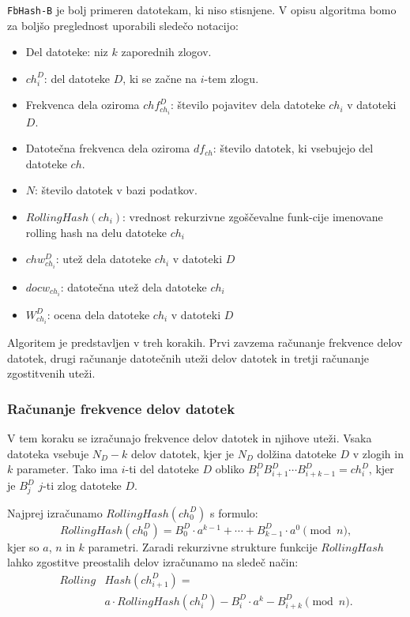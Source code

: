 \documentclass{acm_proc_article-sp}
\begin{document}
\texttt{FbHash-B} je bolj primeren datotekam, ki niso stisnjene. V opisu algoritma bomo za boljšo preglednost uporabili sledečo notacijo:
\begin{itemize}
  \item Del datoteke: niz $k$ zaporednih zlogov. 
  \item $ch_{i}^D$: del datoteke $D$, ki se začne na $i$-tem zlogu.
  \item Frekvenca dela oziroma $chf_{ch_i}^D$: število pojavitev dela datoteke $ch_i$ v datoteki $D$.
  \item Datotečna frekvenca dela oziroma $df_{ch}$: število datotek, ki vsebujejo del datoteke $ch$.
  \item $N$: število datotek v bazi podatkov.
  \item $RollingHash(ch_i)$: vrednost rekurzivne zgoščevalne funk-cije imenovane rolling hash na delu datoteke $ch_i$
  \item $chw_{ch_i}^D$: utež dela datoteke $ch_i$ v datoteki $D$
  \item $docw_{ch_i}$: datotečna utež dela datoteke $ch_i$
  \item $W_{ch_i}^D$: ocena dela datoteke $ch_i$ v datoteki $D$
\end{itemize}

Algoritem je predstavljen v treh korakih. Prvi zavzema računanje frekvence delov datotek, drugi računanje datotečnih uteži delov datotek in tretji računanje zgostitvenih uteži.

\subsubsection{Računanje frekvence delov datotek}

V tem koraku se izračunajo frekvence delov datotek in njihove uteži. Vsaka datoteka vsebuje $N_D - k$ delov datotek, kjer je $N_D$ dolžina datoteke $D$ v zlogih in $k$ parameter. Tako ima $i$-ti del datoteke $D$ obliko $B_{i}^{D}B_{i+1}^{D} \cdots B_{i+k-1}^{D} = ch_{i}^D$, kjer je $B_{j}^{D}$ $j$-ti zlog datoteke $D$.

Najprej izračunamo $RollingHash(ch_{0}^D)$ s formulo: 
\[RollingHash(ch_{0}^D) = B_{0}^{D} \cdot a^{k-1} + \cdots + B_{k-1}^{D} \cdot a^0 \pmod n,\]
kjer so $a$, $n$ in $k$ parametri. Zaradi rekurzivne strukture funkcije $RollingHash$ lahko zgostitve preostalih delov izračunamo na sledeč način:
\begin{align*}
Rolling&Hash(ch_{i+1}^D) = \\
&a \cdot RollingHash(ch_{i}^D)-B_{i}^{D} \cdot a^{k}-B_{i+k}^D \pmod n.
\end{align*}
\end{document}
